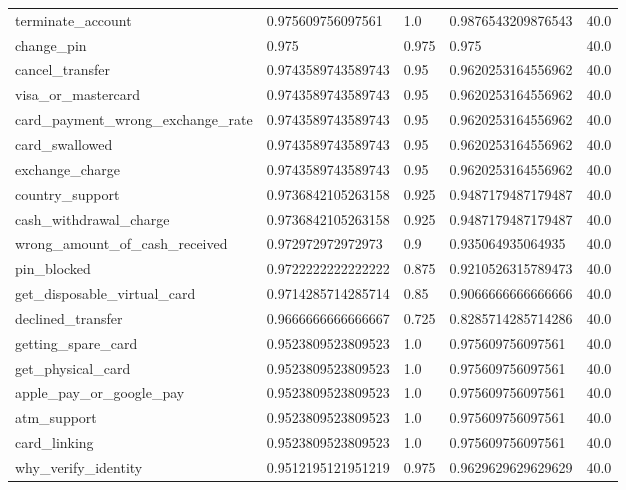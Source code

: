 \begin{table}[!ht]
\begin{tabularx}{\textwidth}{X l l l l}
terminate\_account & \num{0.975609756097561} & \num{1.0} & \num{0.9876543209876543} & \num{40.0} \\
change\_pin & \num{0.975} & \num{0.975} & \num{0.975} & \num{40.0} \\
cancel\_transfer & \num{0.9743589743589743} & \num{0.95} & \num{0.9620253164556962} & \num{40.0} \\
visa\_or\_mastercard & \num{0.9743589743589743} & \num{0.95} & \num{0.9620253164556962} & \num{40.0} \\
card\_payment\_wrong\_exchange\_rate & \num{0.9743589743589743} & \num{0.95} & \num{0.9620253164556962} & \num{40.0} \\
card\_swallowed & \num{0.9743589743589743} & \num{0.95} & \num{0.9620253164556962} & \num{40.0} \\
exchange\_charge & \num{0.9743589743589743} & \num{0.95} & \num{0.9620253164556962} & \num{40.0} \\
country\_support & \num{0.9736842105263158} & \num{0.925} & \num{0.9487179487179487} & \num{40.0} \\
cash\_withdrawal\_charge & \num{0.9736842105263158} & \num{0.925} & \num{0.9487179487179487} & \num{40.0} \\
wrong\_amount\_of\_cash\_received & \num{0.972972972972973} & \num{0.9} & \num{0.935064935064935} & \num{40.0} \\
pin\_blocked & \num{0.9722222222222222} & \num{0.875} & \num{0.9210526315789473} & \num{40.0} \\
get\_disposable\_virtual\_card & \num{0.9714285714285714} & \num{0.85} & \num{0.9066666666666666} & \num{40.0} \\
declined\_transfer & \num{0.9666666666666667} & \num{0.725} & \num{0.8285714285714286} & \num{40.0} \\
getting\_spare\_card & \num{0.9523809523809523} & \num{1.0} & \num{0.975609756097561} & \num{40.0} \\
get\_physical\_card & \num{0.9523809523809523} & \num{1.0} & \num{0.975609756097561} & \num{40.0} \\
apple\_pay\_or\_google\_pay & \num{0.9523809523809523} & \num{1.0} & \num{0.975609756097561} & \num{40.0} \\
atm\_support & \num{0.9523809523809523} & \num{1.0} & \num{0.975609756097561} & \num{40.0} \\
card\_linking & \num{0.9523809523809523} & \num{1.0} & \num{0.975609756097561} & \num{40.0} \\
why\_verify\_identity & \num{0.9512195121951219} & \num{0.975} & \num{0.9629629629629629} & \num{40.0} \\

\end{tabularx}
\end{table}

